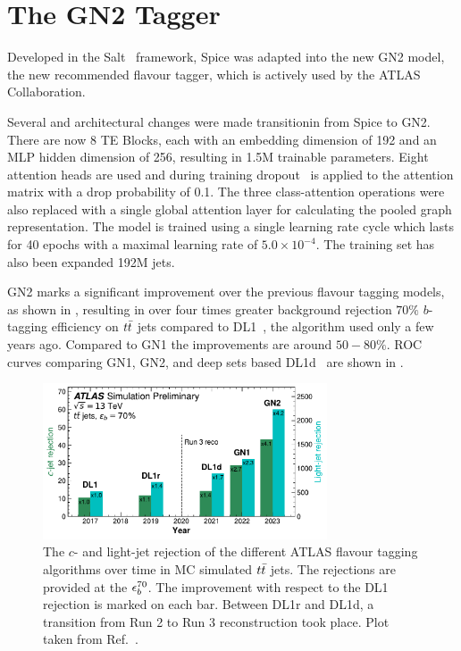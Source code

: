 \FloatBarrier

\section{The GN2 Tagger}

Developed in the Salt~\cite{Salt} framework, Spice was adapted into the new GN2 model, the new recommended flavour tagger, which is actively used by the ATLAS Collaboration.

Several and architectural changes were made transitionin from Spice to GN2.
There are now 8 TE Blocks, each with an embedding dimension of 192 and an MLP hidden dimension of 256, resulting in 1.5M trainable parameters.
Eight attention heads are used and during training dropout~\cite{Dropout} is applied to the attention matrix with a drop probability of 0.1.
The three class-attention operations were also replaced with a single global attention layer for calculating the pooled graph representation.
The model is trained using a single learning rate cycle which lasts for 40 epochs with a maximal learning rate of $5.0 \times 10^{-4}$.
The training set has also been expanded 192M jets.

GN2 marks a significant improvement over the previous flavour tagging models, as shown in , resulting in over four times greater background rejection $70\%$ $b$-tagging efficiency on $t\bar{t}$ jets compared to DL1~\cite{DL1}, the algorithm used only a few years ago.
Compared to GN1 the improvements are around $50-80\%$.
ROC curves comparing GN1, GN2, and deep sets based DL1d~\cite{DL1D}  are shown in .

\begin{figure}
    \centering
    \includegraphics[width=0.75\textwidth]{figures/flavour_tagging/year_improvement.pdf}
    \caption{The $c$- and light-jet rejection of the different ATLAS flavour tagging algorithms over time in MC simulated $t\bar{t}$ jets. The rejections are provided at the $\epsilon_b^{70}$. The improvement with respect to the DL1 rejection is marked on each bar. Between DL1r and DL1d, a transition from Run 2 to Run 3 reconstruction took place. Plot taken from Ref.~\cite{GN2Plots}.}
    \label{fig:ftag_better}
\end{figure}

